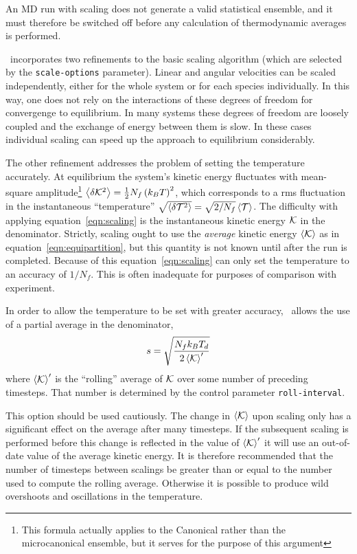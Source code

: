 An MD run with scaling does not generate a valid statistical ensemble,
and it must therefore be switched off before any calculation of
thermodynamic averages is performed.

\moldy\ incorporates two refinements to the basic scaling algorithm
(which are selected by the \verb'scale-options' parameter).  Linear
and angular velocities can be scaled independently, either for the
whole system or for each species individually.  In this way, one does
not rely on the interactions of these degrees of freedom for
convergenge to equilibrium.  In many systems these degrees of freedom
are loosely coupled and the exchange of energy between them is slow.
In these cases individual scaling can speed up the approach to
equilibrium considerably.

The other refinement addresses the problem of setting the temperature
accurately.  At equilibrium the system's kinetic energy fluctuates
with mean-square amplitude\footnote{This formula actually applies to
the Canonical rather than the microcanonical ensemble, but it serves
for the purpose of this argument} $\left < \delta {\cal K}^2\right > =
\frac{1}{2}N_f\left(k_BT\right)^2$, which corresponds to a
rms fluctuation in the instantaneous ``temperature'' 
$\sqrt{\left < \delta {\cal T}^2\right >} = 
\sqrt{2 /N_f}\left < {\cal T}\right >$.   The difficulty with applying equation~\ref{eqn:scaling}
is the instantaneous kinetic energy $\cal K$ in the denominator.
Strictly, scaling ought to use the {\em average} kinetic energy
$\left<\cal K \right>$ as in equation~\ref{eqn:equipartition}, but
this quantity is not known until after the run is completed.  Because
of this equation~\ref{eqn:scaling} can only set the temperature to an
accuracy of $1/N_f$.  This is often inadequate for purposes of
comparison with experiment.

In order to allow the temperature to be set with greater accuracy,
\moldy\ allows the use of a partial average in the denominator,
\begin{equation}
\label{eqn:rav-scaling}
s = \sqrt{\frac{N_fk_BT_d}{2\left < {\cal  K}\right >^\prime}}
\end{equation}
where $\left < {\cal K}\right >^\prime$ is the ``rolling'' average of
$\cal K$ over some number of preceding timesteps.  That number is
determined by the control parameter \verb'roll-interval'.   

This option should be used cautiously.  The change in $\left <{\cal
K}\right >$ upon scaling only has a significant effect on the average
after many timesteps. If the subsequent scaling is performed before
this change is reflected in the value of $\left < {\cal K}\right
>^\prime$ it will use an out-of-date value of the average kinetic
energy.  It is therefore recommended that the number of timesteps
between scalings be greater than or equal to the number used to
compute the rolling average.  Otherwise it is possible to produce wild
overshoots and oscillations in the temperature.

